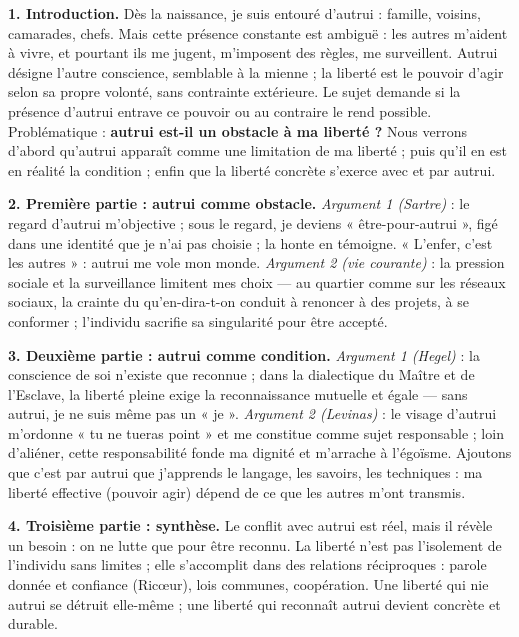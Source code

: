 \documentclass[11pt]{article}
\newcounter{popsec}
\newcounter{popsub}
\newcommand{\courssub}[1]{%
  \stepcounter{popsub}%
  \par\vspace{9pt}\noindent{\popxbold\fontsize{11.5}{13}\selectfont\color{popink}{\color{poporange}\thepopsec.\thepopsub}\hspace{6pt}#1}\par\nopagebreak\vspace{4pt}
}
\begin{document}
\courssub{Je me prépare au Bac}

\begin{corrige}
\textbf{1. Introduction.} Dès la naissance, je suis entouré d'autrui : famille, voisins, camarades, chefs. Mais cette présence constante est ambiguë : les autres m'aident à vivre, et pourtant ils me jugent, m'imposent des règles, me surveillent. Autrui désigne l'autre conscience, semblable à la mienne ; la liberté est le pouvoir d'agir selon sa propre volonté, sans contrainte extérieure. Le sujet demande si la présence d'autrui entrave ce pouvoir ou au contraire le rend possible. Problématique : \textbf{autrui est-il un obstacle à ma liberté ?} Nous verrons d'abord qu'autrui apparaît comme une limitation de ma liberté ; puis qu'il en est en réalité la condition ; enfin que la liberté concrète s'exerce avec et par autrui.

\textbf{2. Première partie : autrui comme obstacle.} \emph{Argument 1 (Sartre)} : le regard d'autrui m'objective ; sous le regard, je deviens « être-pour-autrui », figé dans une identité que je n'ai pas choisie ; la honte en témoigne. « L'enfer, c'est les autres » : autrui me vole mon monde. \emph{Argument 2 (vie courante)} : la pression sociale et la surveillance limitent mes choix — au quartier comme sur les réseaux sociaux, la crainte du qu'en-dira-t-on conduit à renoncer à des projets, à se conformer ; l'individu sacrifie sa singularité pour être accepté.

\textbf{3. Deuxième partie : autrui comme condition.} \emph{Argument 1 (Hegel)} : la conscience de soi n'existe que reconnue ; dans la dialectique du Maître et de l'Esclave, la liberté pleine exige la reconnaissance mutuelle et égale — sans autrui, je ne suis même pas un « je ». \emph{Argument 2 (Levinas)} : le visage d'autrui m'ordonne « tu ne tueras point » et me constitue comme sujet responsable ; loin d'aliéner, cette responsabilité fonde ma dignité et m'arrache à l'égoïsme. Ajoutons que c'est par autrui que j'apprends le langage, les savoirs, les techniques : ma liberté effective (pouvoir agir) dépend de ce que les autres m'ont transmis.

\textbf{4. Troisième partie : synthèse.} Le conflit avec autrui est réel, mais il révèle un besoin : on ne lutte que pour être reconnu. La liberté n'est pas l'isolement de l'individu sans limites ; elle s'accomplit dans des relations réciproques : parole donnée et confiance (Ricœur), lois communes, coopération. Une liberté qui nie autrui se détruit elle-même ; une liberté qui reconnaît autrui devient concrète et durable.


\end{corrige}
\end{document}
